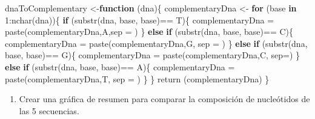 \documentclass[
]{article}
\newenvironment{Shaded}{\begin{snugshade}}{\end{snugshade}}
\newcommand{\AttributeTok}[1]{\textcolor[rgb]{0.77,0.63,0.00}{#1}}
\newcommand{\ControlFlowTok}[1]{\textcolor[rgb]{0.13,0.29,0.53}{\textbf{#1}}}
\newcommand{\DecValTok}[1]{\textcolor[rgb]{0.00,0.00,0.81}{#1}}
\newcommand{\FunctionTok}[1]{\textcolor[rgb]{0.00,0.00,0.00}{#1}}
\newcommand{\NormalTok}[1]{#1}
\newcommand{\OtherTok}[1]{\textcolor[rgb]{0.56,0.35,0.01}{#1}}
\newcommand{\SpecialCharTok}[1]{\textcolor[rgb]{0.00,0.00,0.00}{#1}}
\newcommand{\StringTok}[1]{\textcolor[rgb]{0.31,0.60,0.02}{#1}}
\providecommand{\tightlist}{%
  \setlength{\itemsep}{0pt}\setlength{\parskip}{0pt}}
\begin{document}
\begin{Shaded}
\begin{Highlighting}[]
\NormalTok{dnaToComplementary }\OtherTok{\textless{}{-}}\ControlFlowTok{function}\NormalTok{ (dna)\{}
\NormalTok{  complementaryDna }\OtherTok{\textless{}{-}}\StringTok{\textquotesingle{}\textquotesingle{}}
  \ControlFlowTok{for}\NormalTok{ (base }\ControlFlowTok{in} \DecValTok{1}\SpecialCharTok{:}\FunctionTok{nchar}\NormalTok{(dna))\{}
    \ControlFlowTok{if}\NormalTok{ (}\FunctionTok{substr}\NormalTok{(dna, base, base)}\SpecialCharTok{==} \StringTok{\textquotesingle{}T\textquotesingle{}}\NormalTok{)\{}
\NormalTok{      complementaryDna }\OtherTok{=} \FunctionTok{paste}\NormalTok{(complementaryDna,}\StringTok{\textquotesingle{}A\textquotesingle{}}\NormalTok{,}\AttributeTok{sep =} \StringTok{\textquotesingle{}\textquotesingle{}}\NormalTok{)}
\NormalTok{    \}}
    \ControlFlowTok{else} \ControlFlowTok{if}\NormalTok{ (}\FunctionTok{substr}\NormalTok{(dna, base, base)}\SpecialCharTok{==} \StringTok{\textquotesingle{}C\textquotesingle{}}\NormalTok{)\{}
\NormalTok{      complementaryDna }\OtherTok{=} \FunctionTok{paste}\NormalTok{(complementaryDna,}\StringTok{\textquotesingle{}G\textquotesingle{}}\NormalTok{, }\AttributeTok{sep =} \StringTok{\textquotesingle{}\textquotesingle{}}\NormalTok{)   }
\NormalTok{    \}}
   \ControlFlowTok{else} \ControlFlowTok{if}\NormalTok{ (}\FunctionTok{substr}\NormalTok{(dna, base, base)}\SpecialCharTok{==} \StringTok{\textquotesingle{}G\textquotesingle{}}\NormalTok{)\{}
\NormalTok{      complementaryDna }\OtherTok{=} \FunctionTok{paste}\NormalTok{(complementaryDna,}\StringTok{\textquotesingle{}C\textquotesingle{}}\NormalTok{, }\AttributeTok{sep=}\StringTok{\textquotesingle{}\textquotesingle{}}\NormalTok{)}
\NormalTok{    \}}
   \ControlFlowTok{else} \ControlFlowTok{if}\NormalTok{ (}\FunctionTok{substr}\NormalTok{(dna, base, base)}\SpecialCharTok{==} \StringTok{\textquotesingle{}A\textquotesingle{}}\NormalTok{)\{}
\NormalTok{      complementaryDna }\OtherTok{=} \FunctionTok{paste}\NormalTok{(complementaryDna,}\StringTok{\textquotesingle{}T\textquotesingle{}}\NormalTok{, }\AttributeTok{sep =} \StringTok{\textquotesingle{}\textquotesingle{}}\NormalTok{)   }
\NormalTok{    \}}
\NormalTok{  \}}
  \FunctionTok{return}\NormalTok{ (complementaryDna)}
\NormalTok{\}}
\end{Highlighting}
\end{Shaded}

\begin{enumerate}
\def\labelenumi{\arabic{enumi}.}
\setcounter{enumi}{4}
\tightlist
\item
  Crear una gráfica de resumen para comparar la composición de
  nucleótidos de las 5 secuencias.
\end{enumerate}
\end{document}
